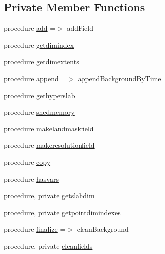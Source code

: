 \subsection*{Private Member Functions}
\begin{DoxyCompactItemize}
\item 
procedure \mbox{\hyperlink{structbackground__mod_1_1background__class_adbf91df5efe766dead76d836cb0663c4}{add}} =$>$ add\+Field
\item 
procedure \mbox{\hyperlink{structbackground__mod_1_1background__class_a91992b0ccc0956daecda2f250ba934d6}{getdimindex}}
\item 
procedure \mbox{\hyperlink{structbackground__mod_1_1background__class_adecdce1f527c3ccb5f57d8b267023f4f}{getdimextents}}
\item 
procedure \mbox{\hyperlink{structbackground__mod_1_1background__class_a2d01f214966eea8a261c03a39d36743a}{append}} =$>$ append\+Background\+By\+Time
\item 
procedure \mbox{\hyperlink{structbackground__mod_1_1background__class_acb4a97a67f51e509fade50ed4b085f07}{gethyperslab}}
\item 
procedure \mbox{\hyperlink{structbackground__mod_1_1background__class_adbeedbb2d82107fe8dca02b72ffadcec}{shedmemory}}
\item 
procedure \mbox{\hyperlink{structbackground__mod_1_1background__class_a0ecab872ceea6e2ad4274daa4670459e}{makelandmaskfield}}
\item 
procedure \mbox{\hyperlink{structbackground__mod_1_1background__class_a7509bacd43458ebee54bb0092422f26d}{makeresolutionfield}}
\item 
procedure \mbox{\hyperlink{structbackground__mod_1_1background__class_a07f5655551267d4801e1e87a1d188420}{copy}}
\item 
procedure \mbox{\hyperlink{structbackground__mod_1_1background__class_aa440524c5d056e02dafe44b0ee699cbd}{hasvars}}
\item 
procedure, private \mbox{\hyperlink{structbackground__mod_1_1background__class_ac7e39271ba1838a3f1548f10ff658de1}{getslabdim}}
\item 
procedure, private \mbox{\hyperlink{structbackground__mod_1_1background__class_a12daf122cea65ebd459e8507ae2389fa}{getpointdimindexes}}
\item 
procedure \mbox{\hyperlink{structbackground__mod_1_1background__class_aa41872e2623f1fb7da1fd4b930e6b100}{finalize}} =$>$ clean\+Background
\item 
procedure, private \mbox{\hyperlink{structbackground__mod_1_1background__class_ae4dfe47f7233a9755631095933ed6276}{cleanfields}}

\end{DoxyCompactItemize}
